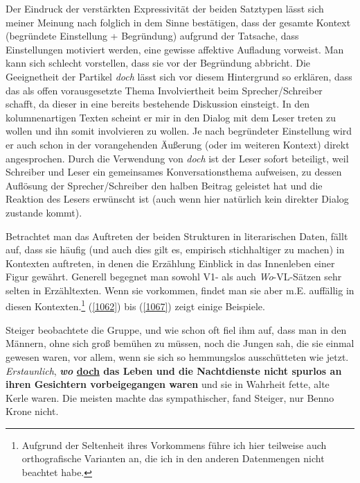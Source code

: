 {Der Eindruck der verstärkten Expressivität der beiden Satztypen lässt sich meiner Meinung nach folglich in dem Sinne bestätigen, dass der gesamte Kontext (begründete Einstellung + Begründung) aufgrund der Tatsache, dass Einstellungen motiviert werden, eine gewisse affektive Aufladung vorweist. Man kann sich schlecht vorstellen, dass sie vor der Begründung abbricht. Die Geeignetheit der Partikel \textit{doch} lässt sich vor diesem Hintergrund so erklären, dass das als offen vorausgesetzte Thema Involviertheit beim Sprecher/Schreiber schafft, da dieser in eine bereits bestehende Diskussion einsteigt. In den kolumnenartigen Texten scheint er mir in den Dialog mit dem Leser treten zu wollen und ihn somit involvieren zu wollen. Je nach begründeter Einstellung wird er auch schon in der vorangehenden Äußerung (oder im weiteren Kontext) direkt angesprochen. Durch die Verwendung von \textit{doch} ist der Leser sofort beteiligt, weil Schreiber und Leser ein gemeinsames Konversationsthema aufweisen, zu dessen Auflösung der Sprecher/Schreiber den \glq halben\grq {} Beitrag geleistet hat und die Reaktion des Lesers erwünscht ist (auch wenn hier natürlich kein direkter Dialog zustande kommt).

Betrachtet man das Auftreten der beiden Strukturen in literarischen Daten, fällt auf, dass sie häufig (und auch dies gilt es, empirisch stichhaltiger zu machen) in Kontexten auftreten, in denen die Erzählung Einblick in das Innenleben einer Figur gewährt. Generell begegnet man sowohl V1- als auch \textit{Wo}-VL-Sätzen sehr selten in Erzähltexten. Wenn sie vorkommen, findet man sie aber m.E. auffällig in diesen Kontexten.\footnote{ Aufgrund der Seltenheit ihres Vorkommens führe ich hier teilweise auch orthografische Varianten an, die ich in den anderen Datenmengen nicht beachtet habe.} (\ref{1062}) bis (\ref{1067}) zeigt einige Beispiele.

\begin{exe}
	\ex\label{1062} 
	\scriptsize
	Steiger beobachtete die Gruppe, und wie schon oft fiel ihm auf, dass man in den Männern, ohne sich groß bemühen zu müssen, noch die Jungen sah, die sie 	einmal gewesen waren, vor allem, wenn sie sich so hemmungslos ausschütteten wie jetzt. \emph{Erstaunlich}, \textbf{\textit{wo} \underline{doch} das 		Leben und die Nachtdienste nicht spurlos an ihren Gesichtern vorbeigegangen waren} und sie in Wahrheit fette, alte Kerle waren. Die meisten machte das 		sympathischer, fand Steiger, nur Benno Krone nicht.
	\newline              		
	\hbox{}\hfill\hbox {\citet[187-188]{Horst2011}}
\end{exe}

}
